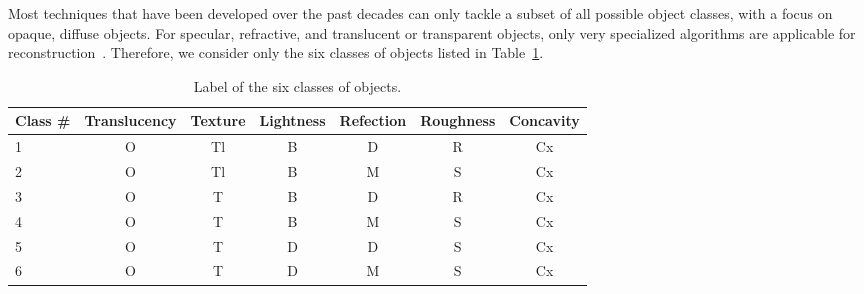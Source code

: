 Most techniques that have been developed over the past decades can only tackle a subset of all possible object classes, with a focus on opaque, diffuse objects. For specular, refractive, and translucent or transparent objects, only very specialized algorithms are applicable for reconstruction~\cite{ihrke2010transparent}. Therefore, we consider only the six classes of objects listed in Table~\ref{tab:six_obj_class}.
\begin{table}[!htbp]
\centering
\begin{tabular}{l|*{6}{c}}
\toprule
Class \# & Translucency & Texture & Lightness & Refection & Roughness & Concavity\\
\midrule
1 & O & Tl & B & D & R & Cx\\
2 & O & Tl & B & M & S & Cx\\
3 & O & T & B & D & R & Cx\\
4 & O & T & B & M & S & Cx\\
5 & O & T & D & D & S & Cx\\
6 & O & T & D & M & S & Cx\\
\bottomrule
\end{tabular}
\caption{Label of the six classes of objects.}
\label{tab:six_obj_class}
\end{table}

